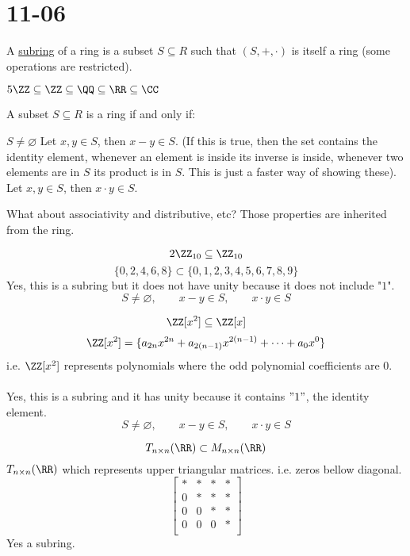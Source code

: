\documentclass[class=scrartcl, crop=false]{standalone}
\date{2019-11-06}
\begin{document}
\section{11-06}

\begin{definition}
  A \ul{subring} of a ring is a subset $S \subseteq R$ such that $(S, + , \cdot)$ is itself a ring (some operations are restricted).
  \begin{example}
    $5\ZZ \subseteq \ZZ \subseteq \QQ \subseteq \RR \subseteq \CC$
  \end{example} 
\end{definition} 
\begin{proposition}
  A subset $S \subseteq R$ is a ring if and only if:
  \begin{enumerate}
    \ii
    $S \neq \varnothing$ 
    \ii
    Let $x, y \in S$, then $x - y \in S$. (If this is true, then the set contains the identity element, whenever an element is inside its inverse is inside, whenever two elements are in $S$ its product is in $S$. This is just a faster way of showing these).
    \ii
    Let $x, y \in S$, then $x \cdot y \in S$.
  \end{enumerate} 
  What about associativity and distributive, etc? Those properties are inherited from the ring.
\end{proposition} 
\begin{example}
  \[2\ZZ_{10} \subseteq \ZZ_{10}\]
  \[
    \{0, 2, 4, 6, 8\} \subset \{0, 1, 2, 3, 4, 5, 6, 7, 8, 9\}
  \]
  Yes, this is a subring but it does not have unity because it does not include "$1$".
  \[S \neq \varnothing, \qquad x - y \in S, \qquad x \cdot y \in S\]
\end{example} 
\begin{example}
  \[\ZZ[x^2] \subseteq \ZZ[x]\]
  \[
    \ZZ[x^2] = \{a_{2n}x^{2n} + a_{2(n - 1)}x^{2(n - 1)} + \cdots + a_0x^0\}
  \]
  i.e. $\ZZ[x^2]$ represents polynomials where the odd polynomial coefficients are 0.
  \\\\
  Yes, this is a subring and it has unity because it contains $"1"$, the identity element.
  \[S \neq \varnothing, \qquad x - y \in S, \qquad x \cdot y \in S\]
\end{example} 
\begin{example}
  \[
    T_{n \times n}(\RR) \subset M_{n \times n}(\RR)
  \]
  $T_{n \times n}(\RR)$ which represents upper triangular matrices. i.e. zeros bellow diagonal.
  \[
    \begin{bmatrix}
      * & * & * & * \\
      0 & * & * & * \\
      0 & 0 & * & * \\
      0 & 0 & 0 & * \\
    \end{bmatrix} 
  \]
  Yes a subring.
\end{example} 
\end{document}
